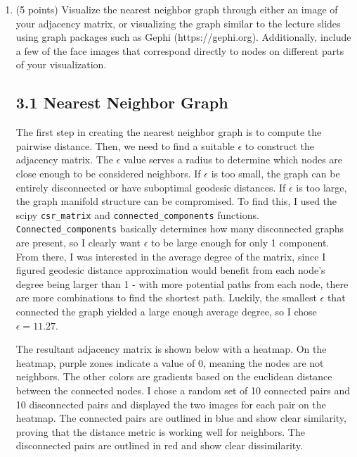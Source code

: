 \documentclass[twoside,10pt]{article}
\begin{document}
\begin{enumerate} 

\item (5 points) Visualize the nearest neighbor graph through either an image of your adjacency matrix, or visualizing the graph similar to the lecture slides using graph packages such as Gephi (\textsf{https://gephi.org}). Additionally, include a few of the face images that correspond directly to nodes on different parts of your visualization.
 \subsection*{3.1 Nearest Neighbor Graph}

 The first step in creating the nearest neighbor graph is to compute the pairwise distance. Then, we need to find a suitable $\epsilon$ to construct the adjacency matrix. The $\epsilon$ value serves a radius to determine which nodes are close enough to be considered neighbors. If $\epsilon$ is too small, the graph can be entirely disconnected or have suboptimal geodesic distances. If $\epsilon$ is too large, the graph manifold structure can be compromised. To find this, I used the scipy \lstinline{csr_matrix} and \lstinline{connected_components} functions. \lstinline{Connected_components} basically determines how many disconnected graphs are present, so I clearly want $\epsilon$ to be large enough for only 1 component. From there, I was interested in the average degree of the matrix, since I figured geodesic distance approximation would benefit from each node's degree being larger than 1 - with more potential paths from each node, there are more combinations to find the shortest path. Luckily, the smallest $\epsilon$ that connected the graph yielded a large enough average degree, so I chose $\epsilon=11.27$.

 The resultant adjacency matrix is shown below with a heatmap. On the heatmap, purple zones indicate a value of 0, meaning the nodes are not neighbors. The other colors are gradients based on the euclidean distance between the connected nodes. I chose a random set of 10 connected pairs and 10 disconnected pairs and displayed the two images for each pair on the heatmap. The connected pairs are outlined in blue and show clear similarity, proving that the distance metric is working well for neighbors. The disconnected pairs are outlined in red and show clear dissimilarity.


\end{enumerate}
\end{document}
